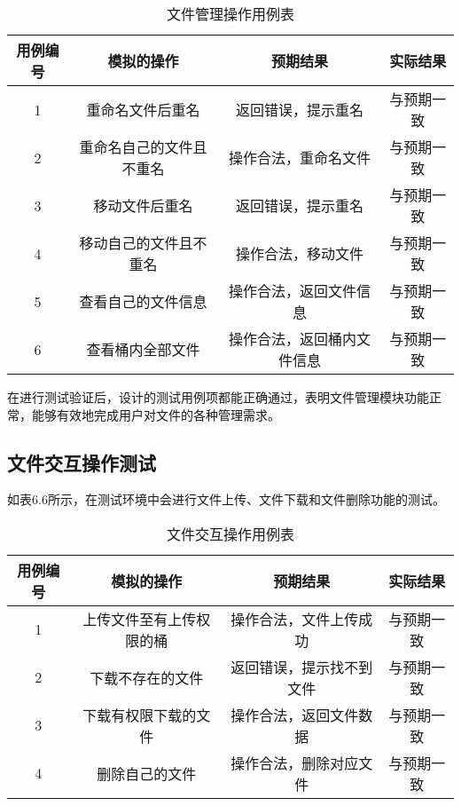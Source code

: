 \begin{table}[h]
  \centering
  \vspace{10pt}
  \caption{文件管理操作用例表}
  \vspace{-15pt}
  \begin{tabular}{cccc}
    \toprule
    用例编号 & 模拟的操作   & 预期结果  & 实际结果 \\
    \midrule
    1 & 重命名文件后重名          & 返回错误，提示重名      & 与预期一致\\
    2 & 重命名自己的文件且不重名   & 操作合法，重命名文件     & 与预期一致\\
    3 & 移动文件后重名            & 返回错误，提示重名      & 与预期一致\\
    4 & 移动自己的文件且不重名     & 操作合法，移动文件       & 与预期一致\\
    5 & 查看自己的文件信息        & 操作合法，返回文件信息    & 与预期一致\\
    6 & 查看桶内全部文件          & 操作合法，返回桶内文件信息 & 与预期一致\\
    \bottomrule
  \end{tabular}
\end{table}

在进行测试验证后，设计的测试用例项都能正确通过，表明文件管理模块功能正常，能够有效地完成用户对文件的各种管理需求。

\subsection{文件交互操作测试}

如表6.6所示，在测试环境中会进行文件上传、文件下载和文件删除功能的测试。

\begin{table}[h]
  \centering
  \vspace{10pt}
  \caption{文件交互操作用例表}
  \vspace{-15pt}
  \begin{tabular}{cccc}
    \toprule
    用例编号 & 模拟的操作   & 预期结果 & 实际结果  \\
    \midrule
    1 & 上传文件至有上传权限的桶   & 操作合法，文件上传成功    & 与预期一致\\
    2 & 下载不存在的文件          & 返回错误，提示找不到文件  & 与预期一致\\
    3 & 下载有权限下载的文件       & 操作合法，返回文件数据   & 与预期一致\\
    4 & 删除自己的文件            & 操作合法，删除对应文件   & 与预期一致\\
    \bottomrule
  \end{tabular}
\end{table}

